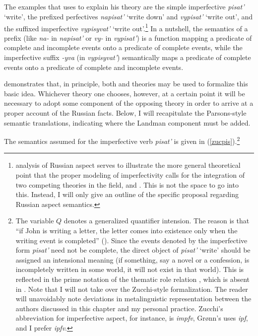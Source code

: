 \documentclass[output=paper,colorlinks,citecolor=brown]{langscibook}
\begin{document}
\subsection{\citet{Zucchi1999}}\label{zucc} 
The examples that \citet{Zucchi1999} uses to explain his theory are the simple imperfective \textit{pisat'}
`write', the prefixed perfectives \textit{napisat'} `write down' and \textit{vypisat'} `write out', and the suffixed imperfective \textit{vypisyvat'} `write out'.\footnote{ analysis of Russian aspect serves to illustrate the more general theoretical point that the proper modeling of imperfectivity calls for the integration of two competing theories in the field, \citet{Landman92} and \citet{Parsons1990}. This is not the space to go into this. Instead, I will only give an outline of the specific proposal regarding Russian aspect semantics.} In a nutshell, the semantics of a prefix (like \textit{na-} in \textit{napisat'} or \textit{vy-} in \textit{vypisat'}) is a function mapping a predicate of complete and incomplete events onto a predicate of complete events, while the imperfective suffix \textit{-yva} (in \textit{vypisyvat'}) semantically maps a predicate of complete events onto a predicate of complete and incomplete events. 

\citet{Zucchi1999} demonstrates that, in principle, both  and  theories may be used to formalize this basic idea. Whichever theory one chooses, however, at a certain point it will be necessary to adopt some component of the opposing theory in order to arrive at a proper account of the Russian facts. Below, I will recapitulate the Parsons-style semantic translations, indicating where the Landman component must be added.  

The semantics assumed for the imperfective verb \textit{pisat'} is given in (\ref{zucpis}).\footnote{The variable $Q$ denotes a generalized quantifier intension. The reason is that 
``if John is writing a letter, the letter comes into existence only when the writing event is completed'' (\citealt[198]{Zucchi1999}). Since the events denoted by the imperfective form \textit{pisat'} need not be complete, the direct object of \textit{pisat'} `write' should be assigned an intensional meaning (if something, say a novel or a confession, is incompletely written in some world, it will not exist in that world). This is reflected in the prime notation of the thematic role relation , which is absent in . Note that I will not take over the Zucchi-style formalization. The reader will unavoidably note deviations in metalinguistic representation between the authors discussed in this chapter and my personal practice. Zucchi's abbreviation for imperfective aspect, for instance, is \textit{impfv}, Gr{\o}nn's uses \textit{ipf}, and I prefer \textit{ipfv}.}
\end{document}
